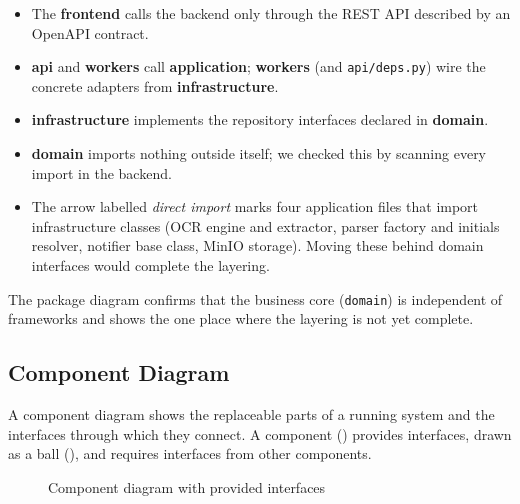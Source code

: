 \begin{itemize}
  \item The \textbf{frontend} calls the backend only through the REST API described by an OpenAPI contract.
  \item \textbf{api} and \textbf{workers} call \textbf{application}; \textbf{workers} (and \texttt{api/deps.py}) wire the concrete adapters from \textbf{infrastructure}.
  \item \textbf{infrastructure} implements the repository interfaces declared in \textbf{domain}.
  \item \textbf{domain} imports nothing outside itself; we checked this by scanning every import in the backend.
  \item The arrow labelled \emph{direct import} marks four application files that import infrastructure classes (OCR engine and extractor, parser factory and initials resolver, notifier base class, MinIO storage). Moving these behind domain interfaces would complete the layering.
\end{itemize}

The package diagram confirms that the business core (\texttt{domain}) is independent of frameworks and shows the one place where the layering is not yet complete.

\subsection{Component Diagram}

A component diagram shows the replaceable parts of a running system and the interfaces through which they connect. A component (\symcompnt) provides interfaces, drawn as a ball (\symball), and requires interfaces from other components.

\begin{figure}[!htbp]
  \centering
  \resizebox{\textwidth}{!}{}
  \caption{Component diagram with provided interfaces}
  \label{fig:component}
\end{figure}

